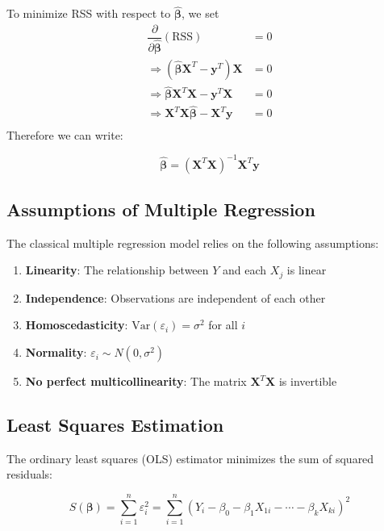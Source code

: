 \documentclass[twoside]{book}
\begin{document}
To minimize RSS with respect to $\hat{\boldsymbol{\beta}}$, we set
\begin{align*}
\dfrac{\partial}{\partial \hat{\boldsymbol{\beta}}} \left( \text{RSS} \right) &= 0 \\[1ex]
\Rightarrow \left( \hat{\boldsymbol{\beta}} \mathbf{X}^T - \mathbf{y}^T \right) \mathbf{X} &= 0 \\[1ex]
\Rightarrow \hat{\boldsymbol{\beta}} \mathbf{X}^T \mathbf{X} - \mathbf{y}^T \mathbf{X} &= 0 \\[1ex]
\Rightarrow \mathbf{X}^T \mathbf{X} \hat{\boldsymbol{\beta}} - \mathbf{X}^T \mathbf{y} &= 0 \\[1ex]
\end{align*}
Therefore we can write:
\begin{textbox}
$$\hat{\boldsymbol{\beta}} = \left( \mathbf{X}^T \mathbf{X} \right)^{-1} \mathbf{X}^T \mathbf{y}$$
\end{textbox}

\subsection{Assumptions of Multiple Regression}

The classical multiple regression model relies on the following assumptions:

\begin{enumerate}
    \item \textbf{Linearity}: The relationship between $Y$ and each $X_j$ is linear
    \item \textbf{Independence}: Observations are independent of each other
    \item \textbf{Homoscedasticity}: $\text{Var}(\varepsilon_i) = \sigma^2$ for all $i$
    \item \textbf{Normality}: $\varepsilon_i \sim N(0, \sigma^2)$
    \item \textbf{No perfect multicollinearity}: The matrix $\mathbf{X}^T\mathbf{X}$ is invertible
\end{enumerate}

\subsection{Least Squares Estimation}

The ordinary least squares (OLS) estimator minimizes the sum of squared residuals:

\begin{equation}
S(\boldsymbol{\beta}) = \sum_{i=1}^{n} \varepsilon_i^2 = \sum_{i=1}^{n} (Y_i - \beta_0 - \beta_1 X_{1i} - \cdots - \beta_k X_{ki})^2
\end{equation}
\end{document}
